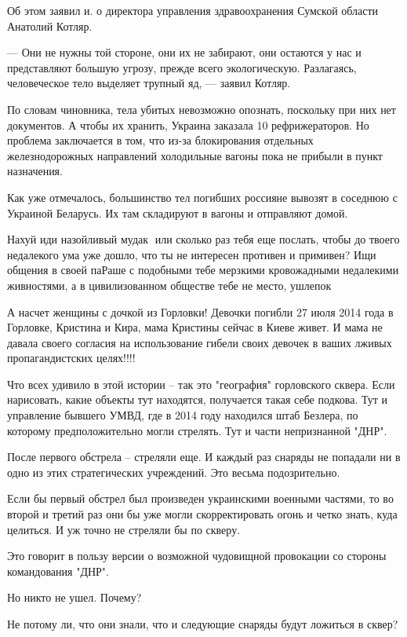 Об этом заявил и. о директора управления здравоохранения Сумской области
Анатолий Котляр.

— Они не нужны той стороне, они их не забирают, они остаются у нас и
представляют большую угрозу, прежде всего экологическую. Разлагаясь,
человеческое тело выделяет трупный яд, — заявил Котляр.

По словам чиновника, тела убитых невозможно опознать, поскольку при них нет
документов. А чтобы их хранить, Украина заказала 10 рефрижераторов. Но проблема
заключается в том, что из-за блокирования отдельных железнодорожных направлений
холодильные вагоны пока не прибыли в пункт назначения.

Как уже отмечалось, большинство тел погибших россияне вывозят в соседнюю с
Украиной Беларусь. Их там складируют в вагоны и отправляют домой.

Нахуй иди назойливый мудак🖕 или сколько раз тебя еще послать, чтобы до твоего
недалекого ума уже дошло, что ты не интересен противен и примивен? Ищи общения
в своей паРаше с подобными тебе мерзкими кровожадными недалекими живностями, а
в цивилизованном обществе тебе не место, ушлепок🖕

А насчет женщины с дочкой из Горловки! Девочки погибли 27 июля 2014 года в
Горловке, Кристина и Кира, мама Кристины сейчас в Киеве живет. И мама не давала
своего согласия на использование гибели своих девочек в ваших лживых
пропагандистских целях!!!!

Что всех удивило в этой истории – так это "география" горловского сквера. Если
нарисовать, какие объекты тут находятся, получается такая себе подкова. Тут и
управление бывшего УМВД, где в 2014 году находился штаб Безлера, по которому
предположительно могли стрелять. Тут и части непризнанной "ДНР".

После первого обстрела – стреляли еще. И каждый раз снаряды не попадали ни в
одно из этих стратегических учреждений. Это весьма подозрительно.

Если бы первый обстрел был произведен украинскими военными частями, то во
второй и третий раз они бы уже могли скорректировать огонь и четко знать, куда
целиться. И уж точно не стреляли бы по скверу.

Это говорит в пользу версии о возможной чудовищной провокации со стороны
командования "ДНР".

Но никто не ушел. Почему?

Не потому ли, что они знали, что и следующие снаряды будут ложиться в сквер?

